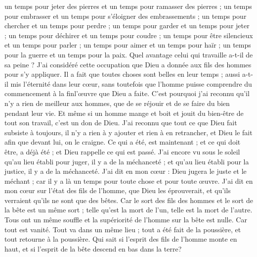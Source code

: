 \begin{multicols}{2}
un temps pour jeter des pierres et un temps pour ramasser des pierres ; un temps pour embrasser et un temps pour s'éloigner des embrassements ;
un temps pour chercher et un temps pour perdre ; un temps pour garder et un temps pour jeter ;
un temps pour déchirer et un temps pour coudre ; un temps pour être silencieux et un temps pour parler ;
un temps pour aimer et un temps pour haïr ; un temps pour la guerre et un temps pour la paix.
Quel avantage celui qui travaille a-t-il de sa peine ?
J’ai considéré cette occupation que Dieu a donnée aux fils des hommes pour s’y appliquer.
Il a fait que toutes choses sont belles en leur temps ; aussi a-t-il mis l'éternité dans leur cœur, sans toutefois que l'homme puisse comprendre du commencement à la finl'œuvre que Dieu a faite. 
C'est pourquoi j'ai reconnu qu'il n'y a rien de meilleur aux hommes, que de se réjouir et de se faire du bien pendant leur vie. 
Et même si un homme mange et boit et jouit du bien-être de tout son travail, c'est un don de Dieu.
J'ai reconnu que tout ce que Dieu fait subsiste à toujours, il n'y a rien à y ajouter et rien à en retrancher, et Dieu le fait afin que devant lui, on le craigne.
Ce qui a été, est maintenant ; et ce qui doit être, a déjà été ; et Dieu rappelle ce qui est passé.
J'ai encore vu sous le soleil qu'au lieu établi pour juger, il y a de la méchanceté ; et qu'au lieu établi pour la justice, il y a de la méchanceté.
J'ai dit en mon cœur : Dieu jugera le juste et le méchant ; car il y a là un temps pour toute chose et pour toute œuvre.
J'ai dit en mon cœur sur l'état des fils de l'homme, que Dieu les éprouverait, et qu'ils verraient qu'ils ne sont que des bêtes.
Car le sort des fils des hommes et le sort de la bête est un même sort ; telle qu'est la mort de l'un, telle est la mort de l'autre. Tous ont un même souffle et la supériorité de l'homme sur la bête est nulle. Car tout est vanité.
Tout va dans un même lieu ; tout a été fait de la poussière, et tout retourne à la poussière.
Qui sait si l'esprit des fils de l'homme monte en haut, et si l'esprit de la bête descend en bas dans la terre?

\end{multicols}
